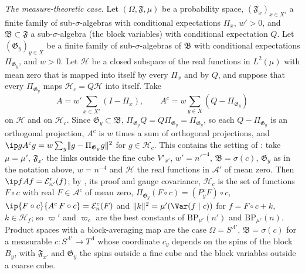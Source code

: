 \emph{The measure-theoretic case.} Let $(\Omega,\mathfrak F,\mu)$ be a
probability space, $(\mathfrak F_x)_{x\in X'}$ a finite family of
sub-$\sigma$-algebras with conditional expectations $\Pi_x$, $w'>0$, and
$\mathfrak B\subset\mathfrak F$ a sub-$\sigma$-algebra (the block variables)
with conditional expectation $Q$. Let $(\mathfrak G_y)_{y\in X}$ be a finite
family of sub-$\sigma$-algebras of $\mathfrak B$ with conditional
expectations $\Pi_{\mathfrak G_y}$, and $w>0$. Let $\mathcal H$ be a closed
subspace of the real functions in $L^2(\mu)$ with mean zero that is mapped
into itself by every $\Pi_x$ and by $Q$, and suppose that every
$\Pi_{\mathfrak G_y}$ maps $\mathcal H_c=Q\mathcal H$ into itself. Take
\[
A=w'\sum_{x\in X'}(I-\Pi_x),\qquad A^c=w\sum_{y\in X}(Q-\Pi_{\mathfrak G_y})
\]
on $\mathcal H$ and on $\mathcal H_c$. Since $\mathfrak G_y\subset\mathfrak
B$, $\Pi_{\mathfrak G_y}Q=Q\Pi_{\mathfrak G_y}=\Pi_{\mathfrak G_y}$, so each
$Q-\Pi_{\mathfrak G_y}$ is an orthogonal projection, $A^c$ is $w$ times a
sum of orthogonal projections, and $\ip g{A^cg}=w\sum_y\lVert g-
\Pi_{\mathfrak G_y}g\rVert^2$ for $g\in\mathcal H_c$. This contains the
setting of \cite[Sec.~X\,K]{BBLR26}: take $\mu=\mu'$, $\mathfrak F_{x'}$
the links outside the fine cube $V'_{x'}$, $w'=n'^{-4}$, $\mathfrak B=
\sigma(c)$, $\mathfrak G_y$ as in the notation above, $w=n^{-4}$ and
$\mathcal H$ the real functions in $\mathcal A'$ of mean zero. Then $\ip f
{Af}=\mathcal E'_{n'}(f)$; by \cite[Lemma~98]{BBLR26}, its proof and gauge covariance,
$\mathcal H_c$ is the set of functions $F\circ c$ with real $F\in\mathcal
A^c$ of mean zero, $\Pi_{\mathfrak G_y}(F\circ c)=(P^c_yF)\circ c$, $\ip
{F\circ c}{A^c\,F\circ c}=\mathcal E^c_n(F)$ and $\lVert k\rVert^2=\mu'(\Var
(f\mid c))$ for $f=F\circ c+k$, $k\in\mathcal H_f$; so $\varpi'$ and
$\varpi_c$ are the best constants of $\mathrm{BP}_{\mu'}(n')$ and
$\mathrm{BP}_{\mu^c}(n)$. Product spaces with a block-averaging map are the
case $\Omega=S^{\Lambda'}$, $\mathfrak B=\sigma(c)$ for a measurable $c:
S^{\Lambda'}\to T^{\Lambda}$ whose coordinate $c_y$ depends on the spins of
the block $B_y$, with $\mathfrak F_{x'}$ and $\mathfrak G_y$ the spins
outside a fine cube and the block variables outside a coarse cube.
